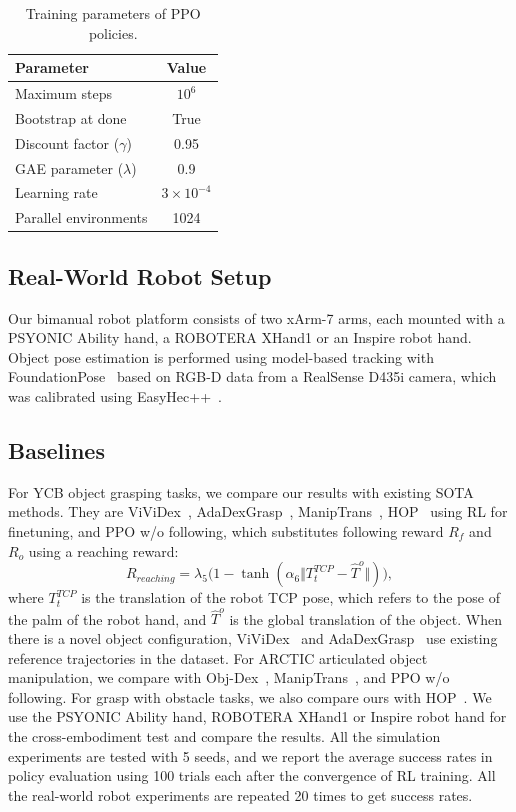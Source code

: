 \documentclass[letterpaper]{article}
\begin{document}
\begin{table}[t]
\centering
\fontsize{9pt}{10.8pt}\selectfont
\renewcommand{\arraystretch}{1.12}
\begin{tabular*}{\columnwidth}{@{\extracolsep{\fill}}lc@{}}
\toprule
Parameter & Value \\
\midrule
Maximum steps & $10^{6}$ \\
Bootstrap at done & True \\
Discount factor ($\gamma$) & 0.95 \\
GAE parameter ($\lambda$) & 0.9 \\
Learning rate & $3\times10^{-4}$ \\
Parallel environments & 1024 \\
\bottomrule
\end{tabular*}
\caption{Training parameters of PPO policies.}
\label{tab:ppo}
\end{table}
\subsection{Real-World Robot Setup} Our bimanual robot platform consists of two xArm-7 arms, each mounted with a PSYONIC Ability hand, a ROBOTERA XHand1 or an Inspire robot hand. Object pose estimation is performed using model-based tracking with FoundationPose~\cite{wen2024foundationpose} based on RGB-D data from a RealSense D435i camera, which was calibrated using EasyHec++~\cite{hong2024easyhec++}.
\subsection{Baselines}
For YCB object grasping tasks, we compare our results with existing SOTA methods. They are ViViDex~\cite{chen2024vividex}, AdaDexGrasp~\cite{shi2025learning}, ManipTrans~\cite{li2025maniptrans}, HOP~\cite{singh2024hand} using RL for finetuning, and PPO w/o following, which substitutes following reward $R_{f}$ and $R_{o}$ using a reaching reward:
\begin{equation*}
    R_{reaching}=\lambda_{5}(1 - \tanh{(\alpha_6 \Vert T_{t}^{TCP} - \hat{T}^{o} \Vert))},
\end{equation*}
 where $T_{t}^{TCP}$ is the translation of the robot TCP pose, which refers to the pose of the palm of the robot hand, and $\hat{T}^{o}$ is the global translation of the object. When there is a novel object configuration, ViViDex~\cite{chen2024vividex} and AdaDexGrasp~\cite{shi2025learning} use existing reference trajectories in the dataset. For ARCTIC articulated object manipulation, we compare with Obj-Dex~\cite{chen2024object}, ManipTrans~\cite{li2025maniptrans}, and PPO w/o following. For grasp with obstacle tasks, we also compare ours with HOP~\cite{singh2024hand}. We use the PSYONIC Ability hand, ROBOTERA XHand1 or Inspire robot hand for the cross-embodiment test and compare the results. All the simulation experiments are tested with 5 seeds, and we report the average success rates in policy evaluation using 100 trials each after the convergence of RL training. All the real-world robot experiments are repeated 20 times to get success rates.
\end{document}
